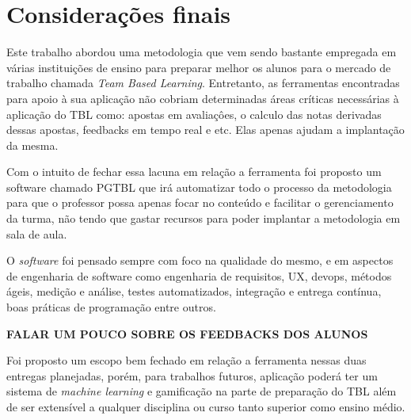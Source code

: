 \chapter{Considerações finais}

Este trabalho abordou uma metodologia que vem sendo bastante empregada em várias instituições de ensino para preparar melhor os alunos para o mercado de trabalho chamada \textit{Team Based Learning}. Entretanto, as ferramentas encontradas para apoio à sua aplicação não cobriam determinadas áreas críticas necessárias à aplicação do TBL como: apostas em avaliaçôes, o calculo das notas derivadas dessas apostas, feedbacks em tempo real e etc. Elas apenas ajudam a implantação da mesma.

Com o intuito de fechar essa lacuna em relação a ferramenta foi proposto um software chamado PGTBL que irá automatizar todo o processo da metodologia para que o professor possa apenas focar no conteúdo e facilitar o gerenciamento da turma, não tendo que gastar recursos para poder implantar a metodologia em sala de aula.

O \textit{software} foi pensado sempre com foco na qualidade do mesmo, e em aspectos de engenharia de software como engenharia de requisitos, UX, devops, métodos ágeis, medição e análise, testes automatizados, integração e entrega contínua, boas práticas de programação entre outros.

\textbf{FALAR UM POUCO SOBRE OS FEEDBACKS DOS ALUNOS}

Foi proposto um escopo bem fechado em relação a ferramenta nessas duas entregas planejadas, porém, para trabalhos futuros, aplicação poderá ter um sistema de \textit{machine learning} e gamificação na parte de preparação do TBL além de ser extensível a qualquer disciplina ou curso tanto superior como ensino médio.
